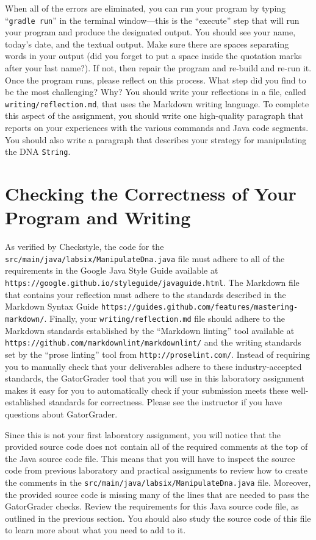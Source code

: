 \documentclass[11pt]{article}
\newcommand{\mainprogramsource}{\lstinline{src/main/java/labsix/ManipulateDna.java}}
\newcommand{\reflection}{\lstinline{writing/reflection.md}}
\newcommand{\gradlerun}{\command{gradle run}}
\newcommand{\command}[1]{``\lstinline{#1}''}
\newcommand{\url}[1]{\lstinline{#1}}
\newcommand{\step}[1]{``{#1}''}
\begin{document}
When all of the errors are eliminated, you can run your program by typing \gradlerun{} in the terminal window---this is
the ``execute'' step that will run your program and produce the designated output. You should see your name, today's
date, and the textual output. Make sure there are spaces separating words in your output (did you forget to put a
space inside the quotation marks after your last name?). If not, then repair the program and re-build and re-run it.
Once the program runs, please reflect on this process. What step did you find to be the most challenging? Why? You
should write your reflections in a file, called \reflection{}, that uses the Markdown writing language. To complete this
aspect of the assignment, you should write one high-quality paragraph that reports on your experiences with the various
commands and Java code segments. You should also write a paragraph that describes your strategy for manipulating the DNA
{\tt String}.

\section*{Checking the Correctness of Your Program and Writing}

As verified by Checkstyle, the code for the \mainprogramsource{} file must adhere to all of the requirements in the
Google Java Style Guide available at \url{https://google.github.io/styleguide/javaguide.html}. The Markdown file that
contains your reflection must adhere to the standards described in the Markdown Syntax Guide
\url{https://guides.github.com/features/mastering-markdown/}. Finally, your \reflection{} file should adhere to the
Markdown standards established by the \step{Markdown linting} tool available at
\url{https://github.com/markdownlint/markdownlint/} and the writing standards set by the \step{prose linting} tool from
\url{http://proselint.com/}. Instead of requiring you to manually check that your deliverables adhere to these
industry-accepted standards, the GatorGrader tool that you will use in this laboratory assignment makes it easy for you
to automatically check if your submission meets these well-established standards for correctness. Please see the
instructor if you have questions about GatorGrader.

Since this is not your first laboratory assignment, you will notice that the provided source code does not contain all of
the required comments at the top of the Java source code file. This means that you will have to inspect the source code
from previous laboratory and practical assignments to review how to create the comments in the \mainprogramsource{}
file. Moreover, the provided source code is missing many of the lines that are needed to pass the GatorGrader checks.
Review the requirements for this Java source code file, as outlined in the previous section. You should also study the
source code of this file to learn more about what you need to add to it.
\end{document}
